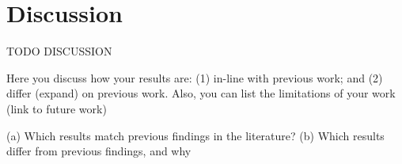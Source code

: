\section{Discussion}
TODO DISCUSSION

Here you discuss how your results are: (1) in-line with previous work; and (2) differ
(expand) on previous work. Also, you can list the limitations of your work (link to future work)

(a) Which results match previous findings in the literature?
(b) Which results differ from previous findings, and why
